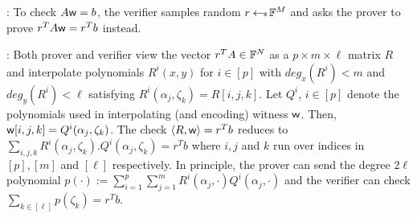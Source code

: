 : To check $A\mathsf{w} = b$, the verifier samples
random $r\hskip2.3pt{\gets\!\!\mbox{\tiny${\$}$\normalsize}}\, \mathbb{F}^M$ and asks the prover to prove $r^TA\mathsf{w} = r^Tb$ instead.
\smallskip

: Both prover and verifier view the
vector $r^TA\in \mathbb{F}^N$ as a $p\times m\times \ell$ matrix $R$ and interpolate
polynomials $R^i(x,y)$ for $i\in [p]$ with $deg_x(R^i)<m$ and $deg_y(R^i)<\ell$
satisfying $R^i(\alpha_j,\zeta_k)=R[i,j,k]$. Let $Q^i$, $i\in [p]$ denote the
polynomials used in interpolating (and encoding) witness $\mathsf{w}$. Then, 
$\mathsf{w}[i,j,k]=Q^i(\alpha_j,\zeta_k)$. The check $\langle R,\mathsf{w}\rangle=r^Tb$ reduces to
$\sum_{i,j,k}R^i(\alpha_j,\zeta_k).Q^i(\alpha_j,\zeta_k)=r^Tb$ where $i,j$ and
$k$ run over indices in $[p],[m]$ and $[\ell]$ respectively. In principle, the
prover can send the degree $2\ell$ polynomial
$p(\cdot):=\sum_{i=1}^p\sum_{j=1}^mR^i(\alpha_j,\cdot)Q^i(\alpha_j,\cdot)$ and
the verifier can check $\sum_{k\in [\ell]} p(\zeta_k)=r^Tb$. 
\smallskip

